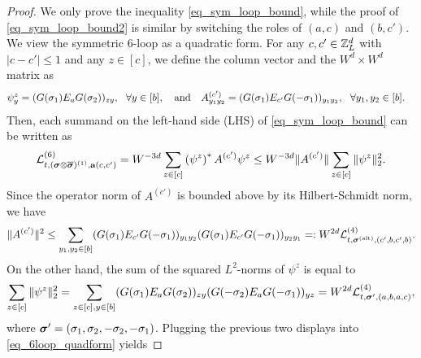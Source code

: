 \begin{proof}

We only prove the inequality \eqref{eq_sym_loop_bound}, while the proof of \eqref{eq_sym_loop_bound2} is similar by switching the roles of $(a,c)$ and $(b,c')$. We view the symmetric $6$-loop as a quadratic form. For any $c,c'\in {\mathbb Z}_L^d$ with $|c-c'|\le 1$ and any $z\in [c]$, we define the column vector  and the $W^d\times W^d$ matrix  as
\begin{align*}
    \psi^{z}_{y} &=  (G(\sigma_1)E_aG(\sigma_2))_{zy}, \ \ \forall y\in [b], \quad \text{and}\quad 
    A^{(c')}_{y_1  y_2} = (G(\sigma_1)E_{c'} G(-\sigma_1))_{y_1 y_2}, \ \ \forall y_1, y_2 \in [b].
\end{align*}
Then, each summand on the left-hand side (LHS) of \eqref{eq_sym_loop_bound} can be written as
\begin{equation}\label{eq_6loop_quadform}
\mathcal{L}^{(6)}_{t, ({\boldsymbol{\sigma}}\otimes \overline{{\boldsymbol{\sigma}}})^{(1)}, {\mathbf{a}}(c,c')} = W^{-3d} \sum_{z\in[c]} \left(\psi^{z}\right)^\ast A^{(c')} \psi^{z} \le W^{-3d} \|A^{(c')}\|  \sum_{z\in[c]} \|\psi^{z}\|_2^2.
\end{equation}
Since the operator norm of $A^{(c')}$ is bounded above by its Hilbert-Schmidt norm, we have
\begin{equation}\label{eq:L4loop}
    \|A^{(c')}\|^2 \le \sum_{y_1,y_2\in [b]} (G(\sigma_1)E_{c'} G(-\sigma_1))_{y_1y_2} (G (\sigma_1)E_{c'}G(-\sigma_1))_{y_2 y_1} =: W^{2d} \mathcal{L}^{(4)}_{t,{\boldsymbol{\sigma}}^{(\mathrm{alt})}, (c',b,c',b)}.
\end{equation}
On the other hand, the sum of the squared $L^2$-norms of $\psi^z$ is equal to
\begin{equation*}
    \sum_{z\in[c]} \|\psi^{z}\|_2^2 =  \sum_{z\in\mathcal [c],y\in [b]} (G(\sigma_1)E_a G(\sigma_2))_{z y} (G(-\sigma_2)E_a G(-\sigma_1))_{y z} = W^{2d} \mathcal{L}^{(4)}_{t, {\boldsymbol{\sigma}}', (a,b,a,c)},
\end{equation*}
where ${\boldsymbol{\sigma}}' = (\sigma_1, \sigma_2, -{\sigma}_2, -{\sigma}_1)$. Plugging the previous two displays into \eqref{eq_6loop_quadform} yields 

\end{proof}
